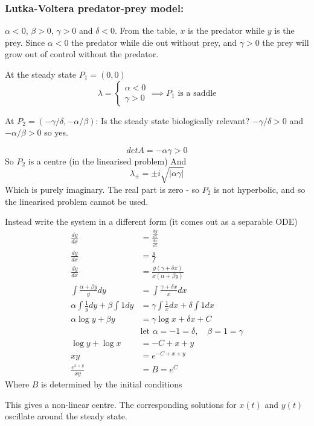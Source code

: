 \documentclass{/home/janmebows/Documents/LatexTemplates/myassignment}
\begin{document}
\subsubsection{Lutka-Voltera predator-prey model:}
$\alpha <0$, $\beta > 0$, $\gamma > 0$ and $\delta < 0$.
From the table, $x$ is the predator while $y$ is the prey. Since $\alpha <0$ the predator while die out without prey, and $\gamma >0$ the prey will grow out of control without the predator.

At the steady state $P_1 = (0,0)$
\[\lambda = \begin{cases}\alpha < 0\\\gamma > 0\end{cases} \implies P_1 \text{ is a saddle}\]

At $P_2 = (-\gamma/\delta, -\alpha/\beta)$:
Is the steady state biologically relevant? $-\gamma/\delta > 0$ and $-\alpha/\beta >0$ so yes.

\[det A = -\alpha\gamma > 0\]
So $P_2$ is a centre (in the linearised problem)
And
\[\lambda_\pm = \pm i \sqrt{|\alpha \gamma|}\]
Which is purely imaginary. The real part is zero - so $P_2$ is not hyperbolic, and so the linearised problem cannot be used.


Instead write the system in a different form (it comes out as a separable ODE)
\begin{align*}
    \frac{dy}{dx} &= \frac{\frac{dy}{dt}}{\frac{dx}{dt}}\\
    \frac{dy}{dx} &= \frac{g}{f} \\
    \frac{dy}{dx} &= \frac{y(\gamma + \delta x)}{x(\alpha + \beta y)}\\
    \int \frac{\alpha + \beta y}y dy &= \int \frac{\gamma + \delta x}{x} dx\\
    \alpha \int \frac1y dy + \beta \int 1 dy &= \gamma \int \frac1x dx + \delta \int 1 dx\\
    \alpha \log y + \beta y &= \gamma \log x + \delta x + C\\
    &\text{let } \alpha = -1 = \delta,\quad \beta =1 =\gamma\\
    \log y + \log x &= - C + x + y\\
    xy &= e^{-C+x+y}\\
    \frac{e^{x+y}}{xy} &= B = e^{C}
\end{align*}
Where $B$ is determined by the initial conditions



This gives a non-linear centre.
The corresponding solutions for $x(t)$ and $y(t)$ oscillate around the steady state.
\end{document}
